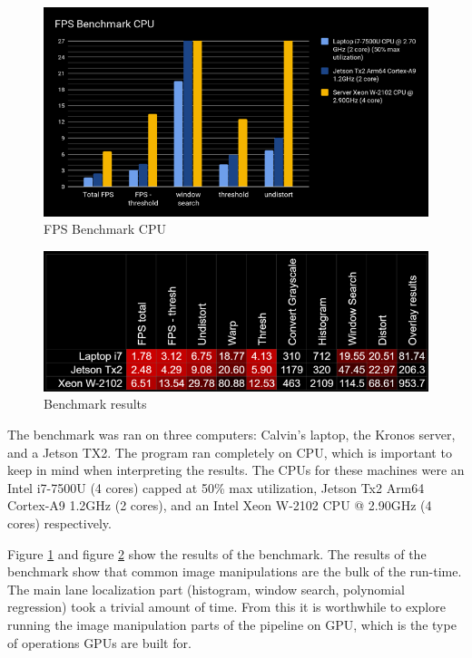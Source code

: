 \documentclass[twoside,twocolumn]{article}
\begin{document}
\begin{figure}
  \includegraphics[width=\linewidth]{calvin1.png}
  \caption{FPS Benchmark CPU}
  \label{fig:cpu}
\end{figure}

\begin{figure}
  \includegraphics[width=\linewidth]{calvin2.png}
  \caption{Benchmark results}
  \label{fig:benchmark}
\end{figure}

\par The benchmark was ran on three computers: Calvin's laptop, the Kronos server, and a Jetson TX2. The program ran completely on CPU, which is important to keep in mind when interpreting the results. The CPUs for these machines were an Intel i7-7500U (4 cores) capped at 50\% max utilization, Jetson Tx2 Arm64 Cortex-A9 1.2GHz (2 cores), and an Intel Xeon W-2102 CPU @ 2.90GHz (4 cores) respectively.

\par Figure \ref{fig:cpu} and figure \ref{fig:benchmark} show the results of the benchmark. The results of the benchmark show that common image manipulations are the bulk of the run-time. The main lane localization part (histogram, window search, polynomial regression) took a trivial amount of time. From this it is worthwhile to explore running the image manipulation parts of the pipeline on GPU, which is the type of operations GPUs are built for.
\end{document}
